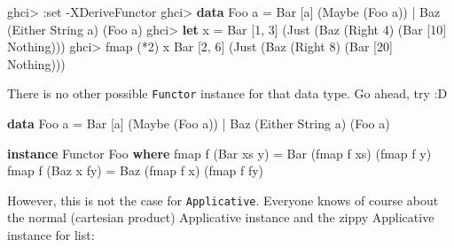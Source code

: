 \documentclass[]{article}
\newenvironment{Shaded}{}{}
\newcommand{\DataTypeTok}[1]{\textcolor[rgb]{0.56,0.13,0.00}{#1}}
\newcommand{\DecValTok}[1]{\textcolor[rgb]{0.25,0.63,0.44}{#1}}
\newcommand{\FunctionTok}[1]{\textcolor[rgb]{0.02,0.16,0.49}{#1}}
\newcommand{\KeywordTok}[1]{\textcolor[rgb]{0.00,0.44,0.13}{\textbf{#1}}}
\newcommand{\NormalTok}[1]{#1}
\begin{document}
\begin{Shaded}
\begin{Highlighting}[]
\NormalTok{ghci}\FunctionTok{>} \FunctionTok{:}\NormalTok{set }\FunctionTok{-}\DataTypeTok{XDeriveFunctor}
\NormalTok{ghci}\FunctionTok{>} \KeywordTok{data} \DataTypeTok{Foo}\NormalTok{ a }\FunctionTok{=} \DataTypeTok{Bar}\NormalTok{ [a] (}\DataTypeTok{Maybe}\NormalTok{ (}\DataTypeTok{Foo}\NormalTok{ a)) }\FunctionTok{|} \DataTypeTok{Baz}\NormalTok{ (}\DataTypeTok{Either} \DataTypeTok{String}\NormalTok{ a) (}\DataTypeTok{Foo}\NormalTok{ a)}
\NormalTok{ghci}\FunctionTok{>} \KeywordTok{let}\NormalTok{ x }\FunctionTok{=} \DataTypeTok{Bar}\NormalTok{ [}\DecValTok{1}\NormalTok{, }\DecValTok{3}\NormalTok{] (}\DataTypeTok{Just}\NormalTok{ (}\DataTypeTok{Baz}\NormalTok{ (}\DataTypeTok{Right} \DecValTok{4}\NormalTok{) (}\DataTypeTok{Bar}\NormalTok{ [}\DecValTok{10}\NormalTok{] }\DataTypeTok{Nothing}\NormalTok{)))}
\NormalTok{ghci}\FunctionTok{>}\NormalTok{ fmap (}\FunctionTok{*}\DecValTok{2}\NormalTok{) x}
\DataTypeTok{Bar}\NormalTok{ [}\DecValTok{2}\NormalTok{, }\DecValTok{6}\NormalTok{] (}\DataTypeTok{Just}\NormalTok{ (}\DataTypeTok{Baz}\NormalTok{ (}\DataTypeTok{Right} \DecValTok{8}\NormalTok{) (}\DataTypeTok{Bar}\NormalTok{ [}\DecValTok{20}\NormalTok{] }\DataTypeTok{Nothing}\NormalTok{)))}
\end{Highlighting}
\end{Shaded}

There is no other possible \texttt{Functor} instance for that data type. Go
ahead, try :D

\begin{Shaded}
\begin{Highlighting}[]
\KeywordTok{data} \DataTypeTok{Foo}\NormalTok{ a }\FunctionTok{=} \DataTypeTok{Bar}\NormalTok{ [a] (}\DataTypeTok{Maybe}\NormalTok{ (}\DataTypeTok{Foo}\NormalTok{ a)) }\FunctionTok{|} \DataTypeTok{Baz}\NormalTok{ (}\DataTypeTok{Either} \DataTypeTok{String}\NormalTok{ a) (}\DataTypeTok{Foo}\NormalTok{ a)}

\KeywordTok{instance} \DataTypeTok{Functor} \DataTypeTok{Foo} \KeywordTok{where}
\NormalTok{    fmap f (}\DataTypeTok{Bar}\NormalTok{ xs y) }\FunctionTok{=} \DataTypeTok{Bar}\NormalTok{ (fmap f xs) (fmap f y)}
\NormalTok{    fmap f (}\DataTypeTok{Baz}\NormalTok{ x fy) }\FunctionTok{=} \DataTypeTok{Baz}\NormalTok{ (fmap f x) (fmap f fy)}
\end{Highlighting}
\end{Shaded}

However, this is not the case for \texttt{Applicative}. Everyone knows of course
about the normal (cartesian product) Applicative instance and the zippy
Applicative instance for list:
\end{document}
